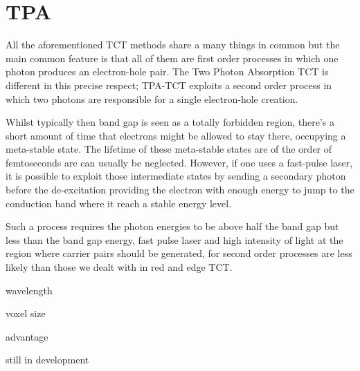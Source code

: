 \section{TPA} %
\label{sec:results_and_comparison_with_tracs_rad}

All the aforementioned TCT methods share a many things in common but the main common feature is that all of them are first order processes in which one photon produces an electron-hole pair. The Two Photon Absorption TCT is different in this precise respect; TPA-TCT exploits a second order process in which two photons are responsible for a single electron-hole creation.

Whilst typically then band gap is seen as a totally forbidden region, there's a short amount of time that electrons might be allowed to stay there, occupying a meta-stable state. The lifetime of these meta-stable states are of the order of femtoseconds are can usually be neglected. However, if one uses a fast-pulse laser, it is possible to exploit those intermediate states by sending a secondary photon before the de-excitation providing the electron with enough energy to jump to the conduction band where it reach a stable energy level.

Such a process requires the photon energies to be above half the band gap but less than the band gap energy, fast pulse laser and high intensity of light at the region where carrier pairs should be generated, for second order processes are less likely than those we dealt with in red and edge TCT.

wavelength

voxel size

advantage

still in development


